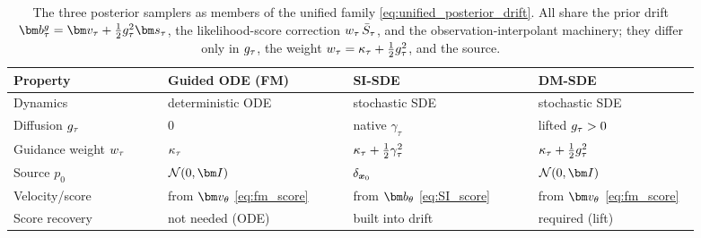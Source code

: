 \begin{table}[ht]
    \centering
    \caption{The three posterior samplers as members of the unified family \eqref{eq:unified_posterior_drift}. All share the prior drift $\drift^{\gdiff}_\tau=\fmvel_\tau+\tfrac12\gdiff_\tau^2\genscore_\tau$, the likelihood-score correction $w_\tau\,\bar S_\tau$, and the observation-interpolant machinery; they differ only in $g_\tau$, the weight $w_\tau=\kappa_\tau+\tfrac12g_\tau^2$, and the source.}
    \label{tab:samplers}
    \small
    \begin{tabular}{p{0.2\linewidth}|p{0.24\linewidth}|p{0.24\linewidth}|p{0.21\linewidth}}
        \toprule
        \textbf{Property} & \textbf{Guided ODE (FM)} & \textbf{SI-SDE} & \textbf{DM-SDE} \\
        \midrule
        Dynamics & deterministic ODE & stochastic SDE & stochastic SDE \\
        Diffusion $g_\tau$ & $0$ & native $\gamma_\tau$ & lifted $g_\tau>0$ \\
        Guidance weight $w_\tau$ & $\kappa_\tau$ & $\kappa_\tau+\tfrac12\gamma_\tau^2$ & $\kappa_\tau+\tfrac12g_\tau^2$ \\
        Source $p_0$ & $\mathcal{N}(0,\bI)$ & $\delta_{\boldsymbol{x}_0}$ & $\mathcal{N}(0,\bI)$ \\
        Velocity/score & from $\fmvel_\theta$ \eqref{eq:fm_score} & from $\drift_\theta$ \eqref{eq:SI_score} & from $\fmvel_\theta$ \eqref{eq:fm_score} \\
        Score recovery & not needed (ODE) & built into drift & required (lift) \\
        \bottomrule
    \end{tabular}
\end{table}

